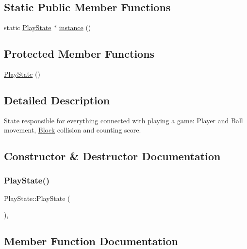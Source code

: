 \subsection*{Static Public Member Functions}
\begin{DoxyCompactItemize}
\item 
static \mbox{\hyperlink{class_play_state}{Play\+State}} $\ast$ \mbox{\hyperlink{class_play_state_a6a46a82e229d66dae0c68244faa7ade3}{instance}} ()
\end{DoxyCompactItemize}
\subsection*{Protected Member Functions}
\begin{DoxyCompactItemize}
\item 
\mbox{\hyperlink{class_play_state_a4d5a25203cf9f78f64143328097fa8c4}{Play\+State}} ()
\end{DoxyCompactItemize}


\subsection{Detailed Description}
State responsible for everything connected with playing a game\+: \mbox{\hyperlink{class_player}{Player}} and \mbox{\hyperlink{class_ball}{Ball}} movement, \mbox{\hyperlink{class_block}{Block}} collision and counting score. 

\subsection{Constructor \& Destructor Documentation}
\mbox{\label{class_play_state_a4d5a25203cf9f78f64143328097fa8c4}} 
\subsubsection{\texorpdfstring{PlayState()}{PlayState()}}
{\footnotesize\ttfamily Play\+State\+::\+Play\+State (\begin{DoxyParamCaption}{ }\end{DoxyParamCaption})\hspace{0.3cm}{\ttfamily [inline]}, {\ttfamily [protected]}}



\subsection{Member Function Documentation}
\mbox{\label{class_play_state_a047657388db62dc5a80b12147b0294b2}} 
